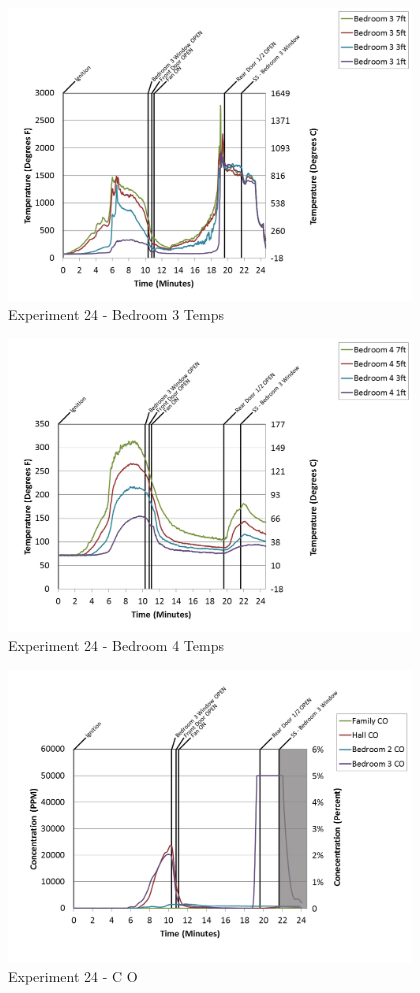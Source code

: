 \documentclass{article}
\begin{document}
\begin{appendices}
\begin{figure}[h!]
	\centering
	\includegraphics[height=3.05in]{0_Images/Results_Charts/Exp_24_Charts/Bedroom3Temps.png}
	\caption{Experiment 24 - Bedroom 3 Temps}
\end{figure}

\clearpage

\begin{figure}[h!]
	\centering
	\includegraphics[height=3.05in]{0_Images/Results_Charts/Exp_24_Charts/Bedroom4Temps.png}
	\caption{Experiment 24 - Bedroom 4 Temps}
\end{figure}


\begin{figure}[h!]
	\centering
	\includegraphics[height=3.05in]{0_Images/Results_Charts/Exp_24_Charts/CO.png}
	\caption{Experiment 24 - C O}
\end{figure}


\end{appendices}
\end{document}
